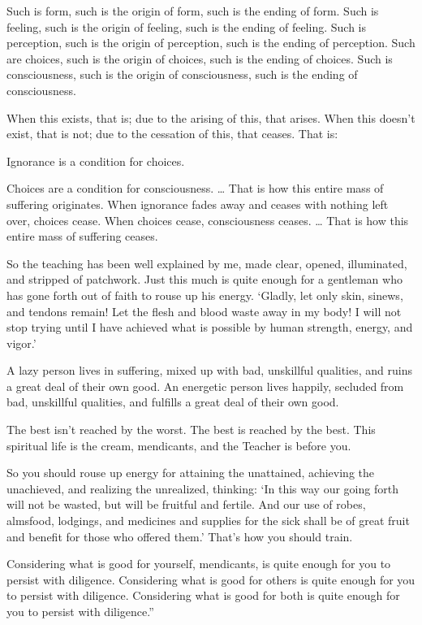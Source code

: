 \documentclass[12pt,openany]{book}%
\begin{document}
Such is form, such is the origin of form, such is the ending of form. Such is feeling, such is the origin of feeling, such is the ending of feeling. Such is perception, such is the origin of perception, such is the ending of perception. Such are choices, such is the origin of choices, such is the ending of choices. Such is consciousness, such is the origin of consciousness, such is the ending of consciousness. 

When this exists, that is; due to the arising of this, that arises. When this doesn’t exist, that is not; due to the cessation of this, that ceases. That is: 

Ignorance is a condition for choices. 

Choices are a condition for consciousness. … That is how this entire mass of suffering originates. When ignorance fades away and ceases with nothing left over, choices cease. When choices cease, consciousness ceases. … That is how this entire mass of suffering ceases. 

So the teaching has been well explained by me, made clear, opened, illuminated, and stripped of patchwork. Just this much is quite enough for a gentleman who has gone forth out of faith to rouse up his energy. ‘Gladly, let only skin, sinews, and tendons remain! Let the flesh and blood waste away in my body! I will not stop trying until I have achieved what is possible by human strength, energy, and vigor.’ 

A lazy person lives in suffering, mixed up with bad, unskillful qualities, and ruins a great deal of their own good. An energetic person lives happily, secluded from bad, unskillful qualities, and fulfills a great deal of their own good. 

The best isn’t reached by the worst. The best is reached by the best. This spiritual life is the cream, mendicants, and the Teacher is before you. 

So you should rouse up energy for attaining the unattained, achieving the unachieved, and realizing the unrealized, thinking: ‘In this way our going forth will not be wasted, but will be fruitful and fertile. And our use of robes, almsfood, lodgings, and medicines and supplies for the sick shall be of great fruit and benefit for those who offered them.’ That’s how you should train. 

Considering what is good for yourself, mendicants, is quite enough for you to persist with diligence. Considering what is good for others is quite enough for you to persist with diligence. Considering what is good for both is quite enough for you to persist with diligence.” 
\end{document}
